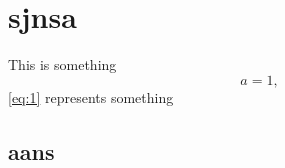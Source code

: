 \chapter{sjnsa}
This is something
\begin{equation}
    a = 1,
\end{equation} \label{eq:1}
\autoref{eq:1} represents something

\newpage
\section{aans}
\cite{Lima_Thesis}